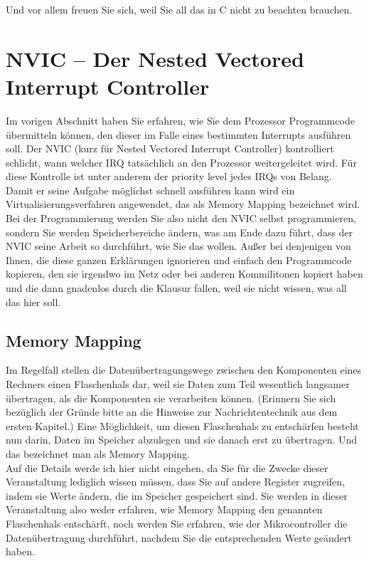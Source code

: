 Und vor allem freuen Sie sich, weil Sie all das in C nicht zu beachten brauchen.

\section{NVIC – Der Nested Vectored Interrupt Controller}

Im vorigen Abschnitt haben Sie erfahren, wie Sie dem Prozessor Programmcode übermitteln können, den dieser im Falle eines bestimmten Interrupts ausführen soll. Der NVIC (kurz für Nested Vectored Interrupt Controller) kontrolliert schlicht, wann welcher IRQ tatsächlich an den Prozessor weitergeleitet wird. Für diese Kontrolle ist unter anderem der priority level jedes IRQs von Belang.\\

Damit er seine Aufgabe möglichst schnell ausführen kann wird ein Virtualisierungsverfahren angewendet, das als Memory Mapping bezeichnet wird. Bei der Programmierung werden Sie also nicht den NVIC selbst programmieren, sondern Sie werden Speicherbereiche ändern, was am Ende dazu führt, dass der NVIC seine Arbeit so durchführt, wie Sie das wollen. Außer bei denjenigen von Ihnen, die diese ganzen Erklärungen ignorieren und einfach den Programmcode kopieren, den sie irgendwo im Netz oder bei anderen Kommilitonen kopiert haben und die dann gnadenlos durch die Klausur fallen, weil sie nicht wissen, was all das hier soll.

\subsection{Memory Mapping}

Im Regelfall stellen die Datenübertragungswege zwischen den Komponenten eines Rechners einen Flaschenhals dar, weil sie Daten zum Teil wesentlich langsamer übertragen, als die Komponenten sie verarbeiten können. (Erinnern Sie sich bezüglich der Gründe bitte an die Hinweise zur Nachrichtentechnik aus dem ersten Kapitel.) Eine Möglichkeit, um diesen Flaschenhals zu entschärfen besteht nun darin, Daten im Speicher abzulegen und sie danach erst zu übertragen. Und das bezeichnet man als Memory Mapping. \\

Auf die Details werde ich hier nicht eingehen, da Sie für die Zwecke dieser Veranstaltung lediglich wissen müssen, dass Sie auf andere Register zugreifen, indem sie Werte ändern, die im Speicher gespeichert sind. Sie werden in dieser Veranstaltung also weder erfahren, wie Memory Mapping den genannten Flaschenhals entschärft, noch werden Sie erfahren, wie der Mikrocontroller die Datenübertragung durchführt, nachdem Sie die entsprechenden Werte geändert haben.\\

